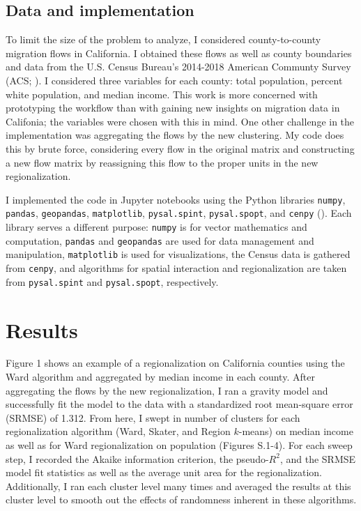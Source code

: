 \documentclass{article}
\begin{document}
    \subsection{Data and implementation}
    To limit the size of the problem to analyze, I considered county-to-county migration flows in California. I obtained these flows as well as county boundaries and data from the U.S. Census Bureau's 2014-2018 American Communty Survey (ACS; \cite{ACS2018}). I considered three variables for each county: total population, percent white population, and median income. This work is more concerned with prototyping the workflow than with gaining new insights on migration data in Califonia; the variables were chosen with this in mind. One other challenge in the implementation was aggregating the flows by the new clustering. My code does this by brute force, considering every flow in the original matrix and constructing a new flow matrix by reassigning this flow to the proper units in the new regionalization. 

    I implemented the code in Jupyter notebooks using the Python libraries \texttt{numpy}, \texttt{pandas}, \texttt{geopandas}, \texttt{matplotlib}, \texttt{pysal.spint}, \texttt{pysal.spopt}, and \texttt{cenpy} (\cite{numpy,pandas,matplotlib}). Each library serves a different purpose: \texttt{numpy} is for vector mathematics and computation, \texttt{pandas} and \texttt{geopandas} are used for data management and manipulation, \texttt{matplotlib} is used for visualizations, the Census data is gathered from \texttt{cenpy}, and algorithms for spatial interaction and regionalization are taken from \texttt{pysal.spint} and \texttt{pysal.spopt}, respectively.

    \section{Results} \label{sec:results}
    Figure 1 shows an example of a regionalization on California counties using the Ward algorithm and aggregated by median income in each county. After aggregating the flows by the new regionalization, I ran a gravity model and successfully fit the model to the data with a standardized root mean-square error (SRMSE) of 1.312. From here, I swept in number of clusters for each regionalization algorithm (Ward, Skater, and Region $k$-means) on median income as well as for Ward regionalization on population (Figures S.1-4). For each sweep step, I recorded the Akaike information criterion, the pseudo-$R^2$, and the SRMSE model fit statistics as well as the average unit area for the regionalization. Additionally, I ran each cluster level many times and averaged the results at this cluster level to smooth out the effects of randomness inherent in these algorithms.
\end{document}
